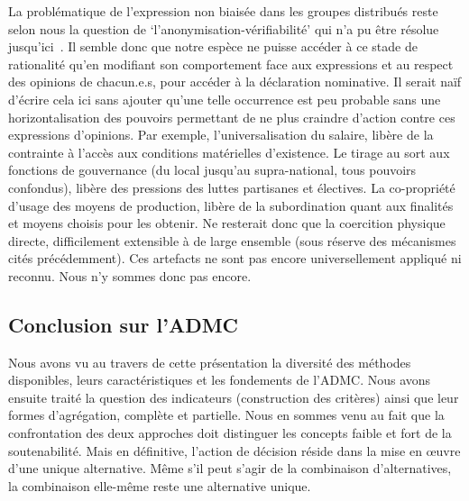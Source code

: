 La problématique de l'expression non biaisée dans les groupes distribués reste selon nous la question de `l'anonymisation-vérifiabilité' qui n'a pu être résolue jusqu'ici~\cite{pellegrini_chaines_2014}.
Il semble donc que notre espèce ne puisse accéder à ce stade de rationalité qu'en modifiant son comportement face aux expressions et au respect des opinions de chacun.e.s, pour accéder à la déclaration nominative.
Il serait naïf d'écrire cela ici sans ajouter qu'une telle occurrence est peu probable sans une horizontalisation des pouvoirs permettant de ne plus craindre d'action contre ces expressions d'opinions.
Par exemple, l'universalisation du salaire, libère de la contrainte à l'accès aux conditions matérielles d'existence.
Le tirage au sort aux fonctions de gouvernance (du local jusqu'au supra-national, tous pouvoirs confondus), libère des pressions des luttes partisanes et électives.
La co-propriété d'usage des moyens de production, libère de la subordination quant aux finalités et moyens choisis pour les obtenir.
Ne resterait donc que la coercition physique directe, difficilement extensible à de large ensemble (sous réserve des mécanismes cités précédemment).
Ces artefacts ne sont pas encore universellement appliqué ni reconnu.
Nous n'y sommes donc pas encore.


\subsection{Conclusion sur l'ADMC}
\label{concl:mcdm}

Nous avons vu au travers de cette présentation la diversité des méthodes disponibles, leurs caractéristiques et les fondements de l'\gls{ADMC}.
Nous avons ensuite traité la question des indicateurs (construction des critères) ainsi que leur formes d'agrégation, complète et partielle.
Nous en sommes venu au fait que la confrontation des deux approches doit distinguer les concepts faible et fort de la soutenabilité.
Mais en définitive, l'action de décision réside dans la mise en œuvre d'une unique alternative.
Même s'il peut s'agir de la combinaison d'alternatives, la combinaison elle-même reste une alternative unique.

